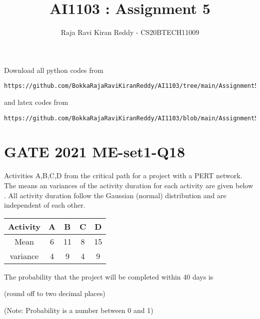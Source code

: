 \documentclass[journal,12pt,twocolumn]{IEEEtran}
\begin{document}
\let\vec\mathbf
\renewcommand{\thefigure}{\theproblem}
\def\putbox#1#2#3{\makebox[0in][l]{\makebox[#1][l]{}\raisebox{\baselineskip}[0in][0in]{\raisebox{#2}[0in][0in]{#3}}}}
     \def\rightbox#1{\makebox[0in][r]{#1}}
     \def\centbox#1{\makebox[0in]{#1}}
     \def\topbox#1{\raisebox{-\baselineskip}[0in][0in]{#1}}
     \def\midbox#1{\raisebox{-0.5\baselineskip}[0in][0in]{#1}}
\vspace{3cm}
\title{AI1103 : Assignment 5}
\author{Raja Ravi Kiran Reddy - CS20BTECH11009}
\maketitle
\newpage
\bigskip
\renewcommand{\thefigure}{\arabic{figure}}
\renewcommand{\thetable}{\arabic{table}}
Download all python codes from 
\begin{lstlisting}
https://github.com/BokkaRajaRaviKiranReddy/AI1103/tree/main/Assignment5/codes
\end{lstlisting}
%
and latex codes from 
%
\begin{lstlisting}
https://github.com/BokkaRajaRaviKiranReddy/AI1103/blob/main/Assignment5/Assignment5.tex
\end{lstlisting}
\section*{GATE 2021 ME-set1-Q18}
Activities A,B,C,D from the critical path for a project with a PERT network. The means an variances of the activity duration for each activity are given below . All activity duration follow the Gaussian (normal) distribution and are independent of each other.

\begin{table}[h!]
\centering
\begin{tabular}{|c||c|c|c|c|}
    \hline
    Activity & A& B& C& D \\
    \hline
    Mean & 6& 11& 8& 15\\[1ex]
    \hline
    variance & 4& 9& 4& 9\\[1ex]
    \hline
\end{tabular}
\end{table}
The probability that the project will be completed within 40 days is  

(round off to two decimal places)

(Note: Probability is a number between 0 and 1)
\end{document}
